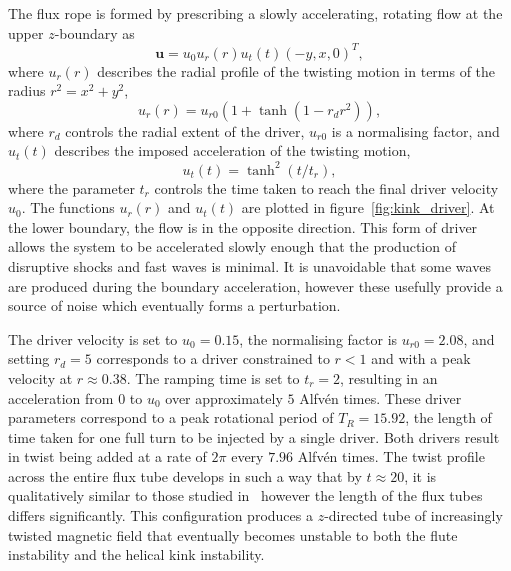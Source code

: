 \documentclass[fleqn,usenatbib]{mnras}
\renewcommand{\vec}[1]{{\bm #1}}
\begin{document}
The flux rope is formed by prescribing a slowly accelerating, rotating flow at the upper $z$-boundary as
\begin{equation}
  \label{eq:null_twisting_profile}
  \vec{u} = u_0 u_r(r) u_t(t) (-y, x, 0)^T,
\end{equation}
where $u_r(r)$ describes the radial profile of the twisting motion in terms of the radius $r^2 = x^2 + y^2$,
\begin{equation}
  \label{eq:radial_twisting_function}
  u_r(r) = u_{r0}(1 + \tanh(1 - r_d r^2)),
\end{equation}
where $r_d$ controls the radial extent of the driver, $u_{r0}$ is a normalising factor, and $u_t(t)$ describes the imposed acceleration of the twisting motion,
\begin{equation}
  \label{eq:ramping_up_function}
  u_t(t) = \tanh^2(t/t_r),
\end{equation}
where the parameter $t_r$ controls the time taken to reach the final driver velocity $u_0$. The functions $u_r(r)$ and $u_t(t)$ are plotted in figure~\ref{fig:kink_driver}. At the lower boundary, the flow is in the opposite direction. This form of driver allows the system to be accelerated slowly enough that the production of disruptive shocks and fast waves is minimal. It is unavoidable that some waves are produced during the boundary acceleration, however these usefully provide a source of noise which eventually forms a perturbation.

The driver velocity is set to $u_0 = 0.15$, the normalising factor is $u_{r0} = 2.08$, and setting $r_d = 5$ corresponds to a driver constrained to $r<1$ and with a peak velocity at $r\approx 0.38$. The ramping time is set to $t_r = 2$, resulting in an acceleration from $0$ to $u_0$ over approximately $5$ Alfv\'en times. These driver parameters correspond to a peak rotational period of $T_R = 15.92$, the length of time taken for one full turn to be injected by a single driver. Both drivers result in twist being added at a rate of $2\pi$ every $7.96$ Alfv\'en times. The twist profile across the entire flux tube develops in such a way that by $t\approx 20$, it is qualitatively similar to those studied in~\citet{quinnEffectAnisotropicViscosity2020,hoodCoronalHeatingMagnetic2009,barefordShockHeatingNumerical2015} however the length of the flux tubes differs significantly. This configuration produces a $z$-directed tube of increasingly twisted magnetic field that eventually becomes unstable to both the flute instability and the helical kink instability.
\end{document}
